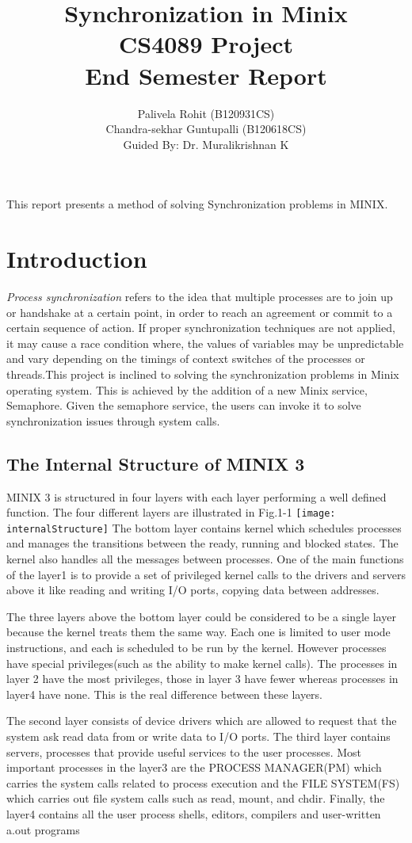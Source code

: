 \documentclass[a4paper,11pt,twocolumn]{article}
\title{Synchronization in Minix\\ {\normalsize CS4089 Project\\End Semester Report}}
\author{Palivela Rohit (B120931CS)\\ Chandra-sekhar Guntupalli (B120618CS)\\Guided By: Dr. Muralikrishnan K}
\begin{document}
\maketitle
\abstract{} 
This report presents a method of solving Synchronization problems in MINIX. 
\section{Introduction}
\textit{Process synchronization} refers to the idea that multiple processes are to join up or handshake at a certain point, in order to reach an agreement or commit to a certain sequence of action. If proper synchronization techniques are not applied, it may cause a race condition where, the values of variables may be unpredictable and vary depending on the timings of context switches of the processes or threads.This project is inclined to solving the synchronization problems in Minix operating system. This is achieved by the addition of a new Minix service, Semaphore. Given the semaphore service, the users can invoke it to solve synchronization issues through system calls.
\subsection{The Internal Structure of MINIX 3}
MINIX 3 is structured in four layers with each layer performing a well defined function. The four different layers are illustrated in Fig.1-1
\texttt{[image: internalStructure]}
The bottom layer contains kernel which schedules processes and manages the transitions between the ready, running and blocked states. The kernel also handles all the messages between processes. One of the main functions of the layer1 is to provide a set of privileged kernel calls to the drivers and servers above it like reading and writing I/O ports, copying data between addresses.

The three layers above the bottom layer could be considered to be a single layer because the kernel treats them the same way. Each one is limited to user mode instructions, and each is scheduled to be run by the kernel. However processes have special privileges(such as the ability to make kernel calls). The processes in layer 2 have the most privileges, those in layer 3 have fewer whereas processes in layer4 have none. This is the real difference between these layers.

The second layer consists of device drivers which are allowed to request that the system ask read data from or write data to I/O ports. The third layer contains servers, processes that provide useful services to the user processes. Most important processes in the layer3 are the PROCESS MANAGER(PM) which carries the system calls related to process execution and the FILE SYSTEM(FS) which carries out file system calls such as read, mount, and chdir. Finally, the layer4 contains all the user process shells, editors, compilers and user-written a.out programs
\end{document}

